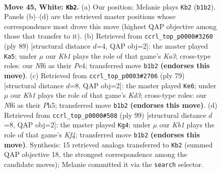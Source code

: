 \documentclass[11pt]{article}
\begin{document}
\clearpage

\begin{figure}[p]\centering
\begin{subfigure}{0.46\textwidth}\centering
\resizebox{\linewidth}{!}{%
\newchessgame
\chessboard[
  setfen={7k/8/5N2/8/2p2P2/1pP5/4p3/1K6 w - - 2 45},
  showmover=false,
  pgfstyle=straightmove, color=movearrow, markmove={b1-b2}
]}
\caption{}
\end{subfigure}\hfill
\begin{subfigure}{0.46\textwidth}\centering
\resizebox{\linewidth}{!}{%
\newchessgame
\chessboard[
  setfen={8/5p2/k7/2p5/P3p1P1/1P6/3K4/8 b - - 3 45},
  showmover=false,
  pgfstyle=straightmove, color=movearrow, markmove={a6-a5}
]}
\caption{}
\end{subfigure}
\\[4pt]
\begin{subfigure}{0.46\textwidth}\centering
\resizebox{\linewidth}{!}{%
\newchessgame
\chessboard[
  setfen={8/8/3k1p2/1K5p/4Pp2/5P1P/8/8 b - - 0 40},
  showmover=false,
  pgfstyle=straightmove, color=movearrow, markmove={d6-e6}
]}
\caption{}
\end{subfigure}\hfill
\begin{subfigure}{0.46\textwidth}\centering
\resizebox{\linewidth}{!}{%
\newchessgame
\chessboard[
  setfen={8/8/2p5/3p1k2/3P3P/2P5/6K1/8 b - - 0 50},
  showmover=false,
  pgfstyle=straightmove, color=movearrow, markmove={f5-g4}
]}
\caption{}
\end{subfigure}
\caption{\textbf{Move 45, White: \texttt{Kb2}.} (a) Our position; Melanie plays \texttt{Kb2} (\texttt{b1b2}). Panels (b)--(d) are the retrieved master positions whose correspondence most drove this move (highest QAP objective among those that transfer to it). (b) Retrieved from \texttt{ccrl\_top\_p0000\#3260} (ply 89) [structural distance $d$=4, QAP obj=2]: the master played \texttt{Ka5}; under $\mu$ our \emph{Kb1} plays the role of that game's \emph{Ka3}; cross-type roles: our \emph{N}f6 as their \emph{P}e4; transferred move \texttt{b1b2} \textbf{(endorses this move)}. (c) Retrieved from \texttt{ccrl\_top\_p0003\#2706} (ply 79) [structural distance $d$=8, QAP obj=2]: the master played \texttt{Ke6}; under $\mu$ our \emph{Kb1} plays the role of that game's \emph{Kd3}; cross-type roles: our \emph{N}f6 as their \emph{P}h5; transferred move \texttt{b1b2} \textbf{(endorses this move)}. (d) Retrieved from \texttt{ccrl\_top\_p0000\#508} (ply 99) [structural distance $d$=8, QAP obj=2]: the master played \texttt{Kg4}; under $\mu$ our \emph{Kb1} plays the role of that game's \emph{Kf4}; transferred move \texttt{b1b2} \textbf{(endorses this move)}. Synthesis: 15 retrieved analogs transferred to \texttt{Kb2} (summed QAP objective 18, the strongest correspondence among the candidate moves); Melanie committed it via the \texttt{search} selector.}
\label{fig:thought-m88}
\end{figure}
\end{document}
